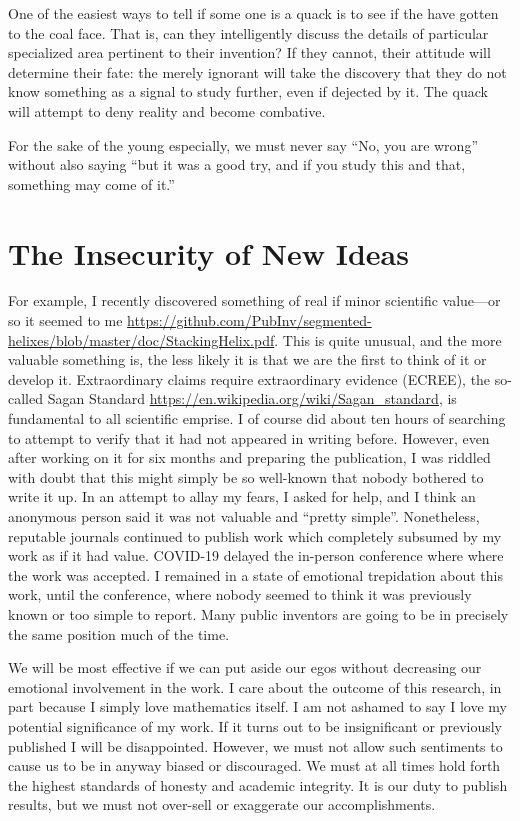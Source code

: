 \documentclass[
	fontsize=10pt, %
	twoside=false, %
	secnumdepth=1, %
]{kaobook}
\begin{document}
One of the easiest ways to tell if some one is a quack is
to see if the have gotten to the coal face.
That is, can they intelligently discuss the details
of particular specialized area pertinent to their invention?
If they cannot, their attitude will determine their fate:
the merely ignorant will take the discovery that they
do not know something as a signal to study further, even if dejected by it.
The quack will attempt to deny reality and become combative.

For the sake of the young especially, we must never say
``No, you are wrong'' without also saying ``but it was
a good try, and if you study this and that, something may come of it.''


\section{The Insecurity of New Ideas}

For example, I recently discovered something of
real if minor scientific value---or so it seemed to me \url{https://github.com/PubInv/segmented-helixes/blob/master/doc/StackingHelix.pdf}.
This is quite unusual, and the more valuable something is,
the less likely it is that we are the first to think of it
or develop it.
Extraordinary claims require extraordinary evidence (ECREE),
the so-called Sagan Standard \url{https://en.wikipedia.org/wiki/Sagan_standard},
is fundamental to all scientific emprise.
I of course did about ten hours of searching to
attempt to verify that it had not appeared in writing before.
However, even after working on it for six months and preparing
the publication, I was riddled with doubt that this might simply
be so well-known that nobody bothered to write it up.
In an attempt to allay my fears, I asked for help, and
I think an anonymous person said it was not valuable and ``pretty simple''.
Nonetheless, reputable journals continued to publish work
which completely subsumed by my work as if it had value.
COVID-19 delayed the
in-person conference where where the work was accepted.
I remained in a state of emotional trepidation about this work,
until the conference, where nobody seemed to think it was previously known
or too simple to report.
Many public inventors are going to be in precisely the
same position much of the time.

We will be most effective if we can put aside our egos
without decreasing our emotional involvement in the work.
I care about the outcome of this research, in part because
I simply love mathematics itself.
I am not ashamed to say I love my potential significance of my work. If it turns out
to be insignificant or previously published I will be disappointed.
However, we must not allow such sentiments to cause
us to be in anyway biased or discouraged.
We must at all times hold forth the highest standards
of honesty and academic integrity.
It is our duty to publish results,
but we must not over-sell or exaggerate our accomplishments.
\end{document}
